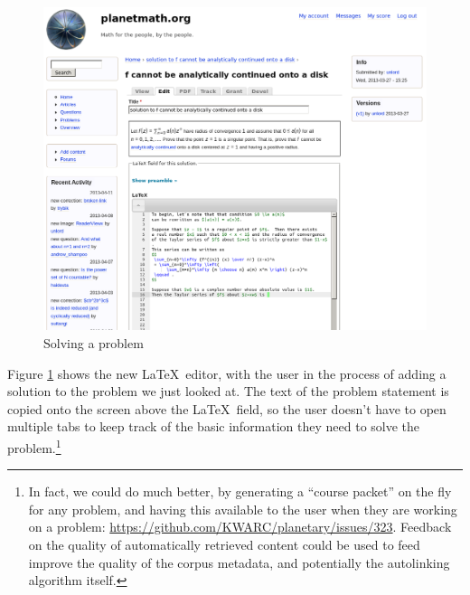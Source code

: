 \begin{vplace}[0.7]
\begin{figure}[h]
\begin{center}
\includegraphics[width=.85\textwidth]{./inputs/SolutionCareOfRay.png}
\end{center}
\caption{Solving a problem \label{SolutionCareOfRay}}
\end{figure}
\bigskip

Figure \ref{SolutionCareOfRay} shows the new \LaTeX\ editor, with the
user in the process of adding a solution to the problem we just looked
at.  The text of the problem statement is copied onto the screen above
the \LaTeX\ field, so the user doesn't have to open multiple tabs to
keep track of the basic information they need to solve the
problem.\footnote{\label{fn:course-packet}In fact, we could do much
  better, by generating a ``course packet'' on the fly for any
  problem, and having this available to the user when they are working
  on a problem: \url{https://github.com/KWARC/planetary/issues/323}.
  Feedback on the quality of automatically retrieved content could be
  used to feed improve the quality of the corpus metadata, and
  potentially the autolinking algorithm itself.}
\end{vplace}

\newpage
\FloatBarrier

